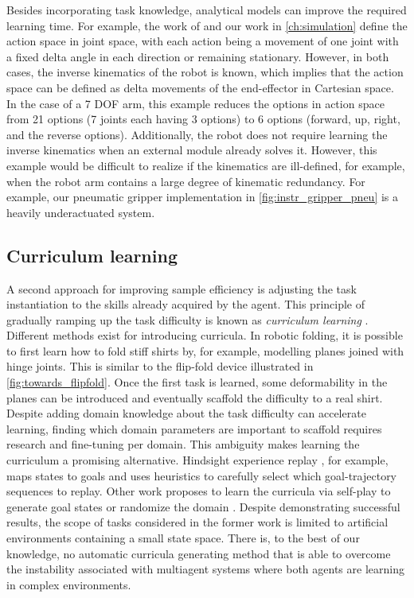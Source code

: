 \documentclass[\home/main.tex]{subfiles}
\begin{document}
Besides incorporating task knowledge, analytical models can improve the required learning time. For example, the work of \textcite{Zhang2015} and our work in \cref{ch:simulation} define the action space in joint space, with each action being a movement of one joint with a fixed delta angle in each direction or remaining stationary. However, in both cases, the inverse kinematics of the robot is known, which implies that the action space can be defined as delta movements of the end-effector in Cartesian space. In the case of a 7 \gls{DOF} arm, this example reduces the options in action space from 21 options (7 joints each having 3 options) to 6 options (forward, up, right, and the reverse options). Additionally, the robot does not require learning the inverse kinematics when an external module already solves it. However, this example would be difficult to realize if the kinematics are ill-defined, for example, when the robot arm contains a large degree of kinematic redundancy. For example, our pneumatic gripper implementation in \cref{fig:instr_gripper_pneu} is a heavily underactuated system.

\clearpage %

\subsection{Curriculum learning}
A second approach for improving sample efficiency is adjusting the task instantiation to the skills already acquired by the agent. This principle of gradually ramping up the task difficulty is known as \emph{curriculum learning} \autocite{Selfridge1985}. Different methods exist for introducing curricula. In robotic folding, it is possible to first learn how to fold stiff shirts by, for example, modelling planes joined with hinge joints. This is similar to the flip-fold device illustrated in \cref{fig:towards_flipfold}. Once the first task is learned, some deformability in the planes can be introduced and eventually scaffold the difficulty to a real shirt. Despite adding domain knowledge about the task difficulty can accelerate learning, finding which domain parameters are important to scaffold requires research and fine-tuning per domain. This ambiguity makes learning the curriculum a promising alternative.
Hindsight experience replay \autocite{andrychowicz2017hindsight}, for example, maps states to goals and uses heuristics to carefully select which goal-trajectory sequences to replay. Other work proposes to learn the curricula via self-play to generate goal states \autocite{sukhbaatar2017intrinsic} or randomize the domain \autocite{raparthy2020generating}. Despite demonstrating successful results, the scope of tasks considered in the former work is limited to artificial environments containing a small state space. There is, to the best of our knowledge, no automatic curricula generating method that is able to overcome the instability associated with multiagent systems where both agents are learning in complex environments.
\end{document}
